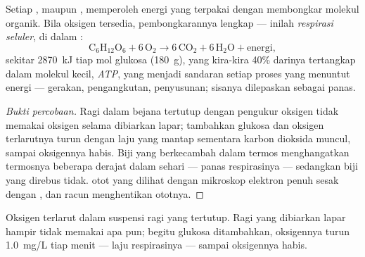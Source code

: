 \begin{proposition}\label{prop:g10:cell-metabolism:respiration}
Setiap ,  maupun , memperoleh energi yang terpakai
dengan membongkar molekul organik. Bila oksigen tersedia,
pembongkarannya lengkap --- inilah \emph{respirasi
seluler}, di dalam :
\[
\mathrm{C_6H_{12}O_6} + 6\,\mathrm{O_2} \longrightarrow
6\,\mathrm{CO_2} + 6\,\mathrm{H_2O} + \text{energi},
\]
sekitar \qty{2870}{kJ} tiap mol glukosa (\qty{180}{g}), yang
kira-kira 40\% darinya tertangkap dalam molekul kecil,
\emph{ATP}, yang menjadi sandaran setiap proses  yang
menuntut energi --- gerakan, pengangkutan, penyusunan; sisanya
dilepaskan sebagai panas.
\end{proposition}
\begin{proof}[Bukti percobaan]
Ragi dalam bejana tertutup dengan pengukur oksigen tidak memakai
oksigen selama dibiarkan lapar; tambahkan glukosa dan oksigen
terlarutnya turun dengan laju yang mantap sementara karbon dioksida
muncul, sampai oksigennya habis. Biji yang berkecambah dalam termos
menghangatkan termosnya beberapa derajat dalam sehari --- panas
respirasinya --- sedangkan biji yang direbus tidak.  otot yang
dilihat dengan mikroskop elektron penuh sesak dengan , dan
racun  menghentikan ototnya.
\end{proof}

\begin{omfigure}

{\small Oksigen terlarut dalam suspensi ragi yang tertutup. Ragi yang
dibiarkan lapar hampir tidak memakai apa pun; begitu glukosa
ditambahkan, oksigennya turun \qty{1.0}{mg/L} tiap menit --- laju
respirasinya --- sampai oksigennya habis.}
\end{omfigure}

